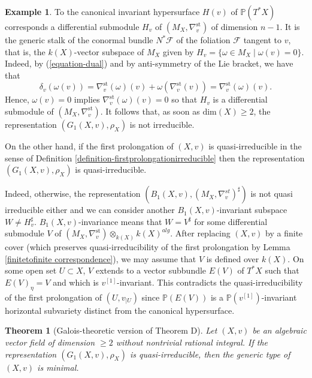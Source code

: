 \documentclass[12pt]{amsart}
\renewcommand{\P}{\mathbb{P}}
\theoremstyle{definition}
\newtheorem{example}[definition]{Example}
\theoremstyle{plain}
\newtheorem{theorem}[definition]{Theorem}
\theoremstyle{exampstyle}
\theoremstyle{exampstyle}\newtheorem{thmxbis}{Theorem}
\numberwithin{equation}{section}
\theoremstyle{remark}
\begin{document}
\begin{example} \label{example-comparison}
To the canonical invariant hypersurface $H(v)$ of $\P(T^\ast X)$ corresponds a differential submodule $H_v$ of $(M_X,\nabla^{\mathrm{st}}_v)$ of dimension $n - 1$. It is the generic stalk of the conormal bundle $N^\ast \mathcal F$ of the foliation $\mathcal F$ tangent to $v$, that is, the $k(X)$-vector subspace of $M_X$ given by 
$H_v = \lbrace \omega \in M_X \mid \omega(v) = 0  \rbrace$.
Indeed, by (\ref{equation-dual}) and by anti-symmetry of the Lie bracket, we have that 
$$ \delta_v(\omega(v)) = \nabla^{\mathrm{st}}_v(\omega)(v) + \omega(\nabla_v^{\mathrm{st}}(v)) =  \nabla^{\mathrm{st}}_v(\omega)(v).$$ 
Hence, $\omega(v) = 0$ implies $\nabla_v^{\mathrm{st}}(\omega)(v) = 0$ so that $H_v$ is a differential submodule of $(M_X,\nabla^{\mathrm{st}}_v)$. It follows that, as soon as $\mathrm{dim}(X) \geq 2$, the representation $(G_1(X,v),\rho_X)$ is not irreducible. 

On the other hand, if the first prolongation of $(X,v)$ is quasi-irreducible in the sense of Definition \ref{definition-firstprolongationirreducible} then the representation $(G_1(X,v),\rho_X)$ is quasi-irreducible.  

Indeed, otherwise, the representation  $(B_1(X,v), (M_X, \nabla^{st}_v)^\sharp)$ is not quasi irreducible either and we can consider another $B_1(X,v)$-invariant subspace $W \neq H_v^\sharp$. $B_1(X,v)$-invariance means that $W = V^\sharp$ for some differential submodule $V$ of $(M_X,\nabla_v^{\mathrm{st}}) \otimes_{k(X)} k(X)^{alg}$. After replacing $(X,v)$ by a finite cover (which preserves quasi-irreducibility of the first prolongation by Lemma \ref{finitetofinite correspondence}), we may assume that $V$ is defined over $k(X)$. On some open set $U \subset X$, $V$ extends to a vector subbundle $E(V)$ of $T^\ast X$ such that $E(V)_\eta = V$ and which is $v^{[1]}$-invariant. This contradicts the quasi-irreducibility of the first prolongation of $(U,v_{\mid U})$ since $\P(E(V))$ is a $\P(v^{[1]})$-invariant horizontal subvariety distinct from the canonical hypersurface. 
\end{example} 


\begin{theorem}[Galois-theoretic version of Theorem D]\label{theorem-C-Galois}
Let $(X,v)$ be an algebraic vector field of dimension $\geq 2$ without nontrivial rational integral. If the representation $(G_1(X,v), \rho_X)$
is quasi-irreducible, then the generic type of $(X,v)$ is minimal. 
\end{theorem} 
\end{document}

